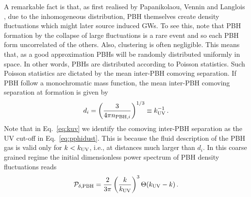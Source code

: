 \documentclass[a4paper,11pt]{article}
\numberwithin{equation}{section}
\begin{document}
A remarkable fact is that, as first realised by Papanikolaou, Vennin and Langlois \cite{Papanikolaou:2020qtd}, due to the inhomogeneous distribution, PBH themselves create density fluctuations which might later source induced GWs. To see this, note that PBH formation by the collapse of large fluctuations is a rare event \cite{Sasaki:2018dmp} and so each PBH form uncorrelated of the others. Also, clustering is often negligible. This means that, as a good approximation PBHs will be randomly distributed uniformly in space. In other words, PBHs are distributed according to Poisson statistics. Such Poisson statistics are dictated by the mean inter-PBH comoving separation. If PBH follow a monochromatic mass function, the mean inter-PBH comoving separation at formation is given by
\begin{align}\label{eq:kuv}
d_i=\left(\frac{3}{4\pi n_{{\rm PBH},i}}\right)^{1/3}\equiv k_{\rm UV}^{-1}\,.
\end{align}
Note that in Eq.~\eqref{eq:kuv} we identify the comoving inter-PBH separation as the UV cut-off in Eq.~\eqref{eq:pphidust}. This is because the fluid description of the PBH gas is valid only for $k<k_{\rm UV}$, i.e., at distances much larger than $d_i$. In this coarse grained regime the initial dimensionless power spectrum of PBH density fluctuations reads \cite{Papanikolaou:2020qtd}
\begin{align}\label{eq:Ppbh}
{\cal P}_{\delta,{\rm PBH}}=\frac{2}{3\pi}\left(\frac{k}{k_{\rm UV}}\right)^3\Theta(k_{\rm UV}-k)\,.
\end{align}
\end{document}
